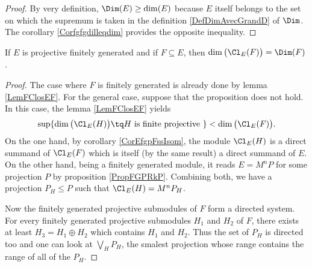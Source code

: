 \begin{proof}
By very definition, $\Dim(E)\geq\dim(E)$ because $E$ itself belongs to the set on which the supremum is taken in the definition \eqref{DefDimAvecGrandD} of $\Dim$. The corollary \ref{Corfgfgdilleqdim} provides the opposite inequality.
\end{proof}

\begin{proposition}		\label{PropProjFiniDimCldim}
If $E$ is projective finitely generated and if $F\subseteq E$, then $\dim\big( \Cl_E(F) \big)=\Dim(F)$.
\end{proposition}

\begin{proof}
The case where $F$ is finitely generated is already done by lemma \ref{LemFClosEF}. For the general case, suppose that the proposition does not hold. In this case, the lemma \ref{LemFClosEF} yields
\begin{equation}
    \sup\{ \dim\big( \Cl_E(H) \big)\tq H \text{ is finite projective } \}<\dim\big( \Cl_E(F) \big).
\end{equation}
On the one hand, by corollary \ref{CorEfgpFssIsom}, the module $\Cl_E(H)$ is a direct summand of $\Cl_E(F)$ which is itself (by the same result) a direct summand of $E$. On the other hand, being a finitely generated module, it reads $E=M^nP$ for some projection $P$ by proposition \ref{PropFGPRkP}. Combining both, we have a projection $P_H\leq P$ such that $\Cl_E(H)=M^nP_H$.

Now the finitely generated projective submodules of $F$ form a directed system. For every finitely generated projective submodules $H_1$ and $H_2$ of $F$, there exists at least $H_3=H_1\oplus H_2$ which contains $H_1$ and $H_2$. Thus the set of $P_H$ is directed too and one can look at $\bigvee_HP_H$, the smalest projection whose range contains the range of all of the $P_H$.


\end{proof}
